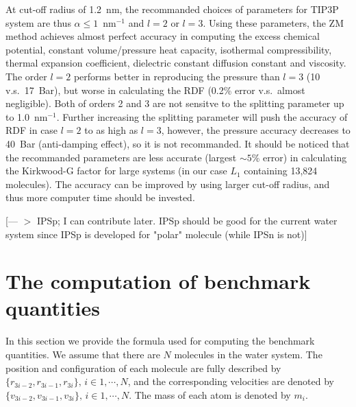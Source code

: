 \documentclass[a4paper,preprint,unsortedaddress,onecolumn,fleqn]{revtex4}
\newcommand{\recheck}[1]{{\color{red} #1}}
\begin{document}
\recheck{
At cut-off radius of 1.2~nm, the recommanded choices of parameters for TIP3P system are
thus $\alpha \leq 1$~$\textrm{nm}^{-1}$ and  $l=2$ or $l=3$.
Using these parameters, the ZM method achieves almost perfect accuracy in
computing the excess chemical potential, constant volume/pressure heat capacity, isothermal
compressibility, thermal expansion coefficient, dielectric constant
diffusion constant and viscosity.
The order $l=2$ performs better in reproducing the
pressure than $l=3$ (10 v.s.~17~Bar), but worse in calculating the RDF (0.2\% error v.s.~almost negligible).
Both of orders 2 and 3 are not sensitve to the splitting parameter up to 1.0~$\textrm{nm}^{-1}$.
Further increasing the splitting parameter will push the accuracy of RDF in case $l=2$ to as high as $l=3$, however, the
pressure accuracy decreases to 40~Bar (anti-damping effect), so it is not recommanded.
It should be noticed that the recommanded parameters are less accurate (largest $\sim 5$\% error)
in calculating the Kirkwood-G factor for large systems (in our case $L_1$ containing 13,824 molecules).
The accuracy can be improved by using larger cut-off radius, and thus more computer
time should be invested.
}


[{\color{blue}---%
$>$ IPSp; I can contribute later. IPSp should be good for the
current water system since IPSp is developed for "polar" molecule (while
IPSn is not)}]

\bigskip

\appendix

\section{The computation of benchmark quantities}

\label{appendix:benchmark}

In this section we provide the formula used for computing the benchmark
quantities. We assume that there are $N$ molecules in the water system. The
position and configuration of each molecule are fully described by $\{%
\mathbf{\mathit{r}}_{3i-2},\mathbf{\mathit{r}}_{3i-1},\mathbf{\mathit{r}}%
_{3i}\},\,i\in 1,\cdots ,N$, and the corresponding velocities are denoted
by $\{\mathbf{\mathit{v}}_{3i-2},\mathbf{\mathit{v}}_{3i-1},\mathbf{\mathit{v}}%
_{3i}\},\,i\in 1,\cdots ,N$. The mass of each atom is denoted by $m_{i}$.
\end{document}
